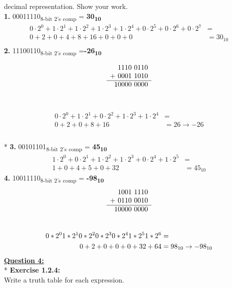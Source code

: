 \documentclass[12pt, letterpaper, twoside]{article}
\begin{document}
decimal representation. Show your work.\\
\break
\noindent\textbf{1.} 00011110\textsubscript{8-bit 2’s comp} = \textbf{30\textsubscript{10}}
\begin{align*}
    0\cdot2^0+1\cdot2^1+1\cdot2^2+1\cdot2^3+1\cdot2^4+0\cdot2^5+0\cdot2^6+0\cdot2^7 &=\\
    0+2+0+4+8+16+0+0+0 &= 30_\text{10}\\
\end{align*}
\newpage
\noindent\textbf{2.} 11100110\textsubscript{8-bit 2’s comp} =\textbf{-26\textsubscript{10}}
\begin{center}
$$\begin{array}[t]{r}
    1110\ 0110 \\
+ \ 0001\ 1010 \\ \hline
    10000\ 0000
\end{array}$$ \\
\end{center}
\begin{align*}
0\cdot2^0+1\cdot2^1+0\cdot2^2+1\cdot2^3+1\cdot2^4 &= \\
0+2+0+8+16 &= 26 \to -26\\
\end{align*}\\*
\noindent\textbf{3.} 00101101\textsubscript{8-bit 2’s comp} = \textbf{45\textsubscript{10}}\\
\begin{align*}
1\cdot2^0+0\cdot2^1+1\cdot2^2+1\cdot2^3+0\cdot2^4+1\cdot2^5 &=\\
1+0+4+5+0+32 &= 45_\text{10}
\end{align*}
\noindent\textbf{4.} 10011110\textsubscript{8-bit 2’s comp} = \textbf{-98\textsubscript{10}}
$$\begin{array}[t]{r}
    1001\ 1110 \\
+ \ 0110\ 0010 \\ \hline
    10000\ 0000
\end{array}$$ \\
\begin{align*}
0*2^0    1*2^1   0*2^2   0*2^3   0*2^4   1*2^5   1*2^6 &=\\
0+2+0+0+0+32+64 &= 98\textsubscript{10} \to -98\textsubscript{10}
\end{align*}
\newpage
\noindent \underline{\textbf{Question 4:}}\\*
\textbf{Exercise 1.2.4:}\\
Write a truth table for each expression.\\
\end{document}
